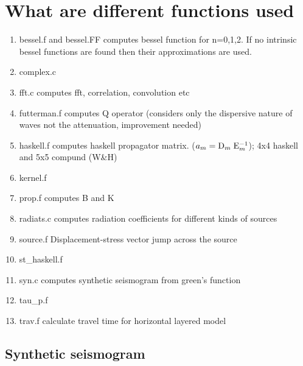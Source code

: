 \documentclass[11pt,titlepage,fleqn]{article}
\begin{document}

\section{What are different functions used}

\begin{enumerate}
\item bessel.f and bessel.FF computes bessel function for n=0,1,2. If no intrinsic bessel functions are found then their approximations are used.
\item complex.c
\item fft.c computes fft, correlation, convolution etc
\item futterman.f computes Q operator (considers only the dispersive nature of waves not the attenuation, improvement needed)
\item haskell.f computes haskell propagator matrix. ($a_m={\rm D}_m\;{\rm E}_m^{-1}$); 4x4 haskell and 5x5 compund (W\&H)
\item kernel.f 
\item prop.f computes B and K
\item radiats.c computes radiation coefficients for different kinds of sources
\item source.f Displacement-stress vector jump across the source
\item st\_haskell.f
\item syn.c computes synthetic seismogram from green's function
\item tau\_p.f
\item trav.f calculate travel time for horizontal layered model
\end{enumerate}

\subsection{Synthetic seismogram}
\end{document}

